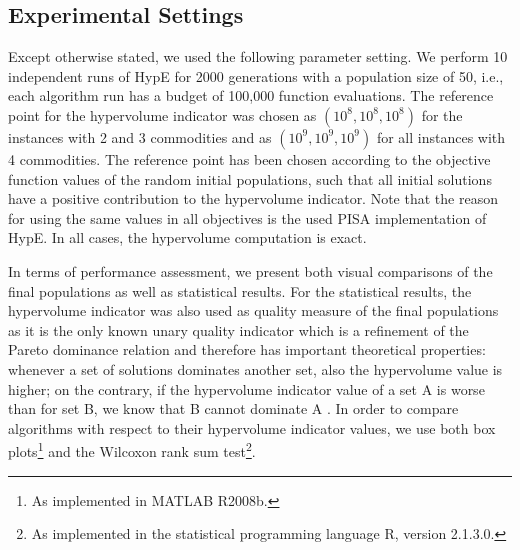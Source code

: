 \documentclass[preprint,12pt]{elsarticle}
\begin{document}

\subsection{Experimental Settings}
Except otherwise stated, we used the following parameter setting. We perform 10 independent runs of HypE for 2000 generations with a population size of 50, i.e., each algorithm run has a budget of 100,000 function evaluations. The reference point for the hypervolume indicator was chosen as $(10^8, 10^8, 10^8)$ for the instances with 2 and 3 commodities and as $(10^9, 10^9, 10^9)$ for all instances with 4 commodities. The reference point has been chosen according to the objective function values of the random initial populations, such that all initial solutions have a positive contribution to the hypervolume indicator. Note that the reason for using the same values in all objectives is the used PISA implementation of HypE. In all cases, the hypervolume computation is exact.

In terms of performance assessment, we present both visual comparisons of the final populations as well as statistical results. For the statistical results, the hypervolume indicator was also used as quality measure of the final populations as it is the only known unary quality indicator  which is a refinement of the Pareto dominance relation and therefore has important theoretical properties: whenever a set of solutions dominates another set, also the hypervolume value is higher; on the contrary, if the hypervolume indicator value of a set A is worse than for set B, we know that B cannot dominate A \citep{ztlf2003a,ztb2010a}. In order to compare algorithms with respect to their hypervolume indicator values, we use both box plots\footnote{As implemented in MATLAB R2008b.} and the Wilcoxon rank sum test\footnote{As implemented in the statistical programming language R, version 2.1.3.0.}.
\end{document}
